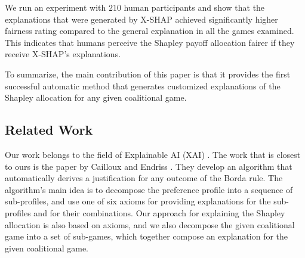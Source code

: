 \documentclass[letterpaper]{article} %
\begin{document}
We run an experiment with $210$ human participants and show that %
the explanations that were generated by X-SHAP achieved significantly higher fairness rating compared to the general explanation in all the games examined. This indicates that humans perceive the Shapley payoff allocation fairer if they receive X-SHAP's explanations.

To summarize, the main contribution of this paper is that it provides the first successful automatic method that generates customized explanations of the Shapley allocation for any given coalitional game.



\subsection{Related Work}
Our work belongs to the field of Explainable AI (XAI) \cite{gunning2019xai}. %
%
The work that is closest to ours is the paper by Cailloux and Endriss \cite{Cailloux2016ArguingAV}.
They %
develop an algorithm that automatically derives a justification for any outcome of the Borda rule. The algorithm's main idea is to decompose the preference profile into a sequence of sub-profiles, and use one of six axioms for providing explanations for the sub-profiles and for their combinations. %
Our approach for explaining the Shapley allocation is also based on axioms, and we also decompose the given coalitional game into a set of sub-games, which together compose an explanation for the given coalitional game.
\end{document}
